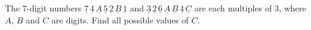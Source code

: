 The $7$-digit numbers $\underline{7}\,\underline{4}\,\underline{A}\,\underline{5}\,\underline{2}\,\underline{B}\,\underline{1}$ and $\underline{3}\,\underline{2}\,\underline{6}\,\underline{A}\,\underline{B}\,\underline{4}\,\underline{C}$ are each multiples of $3$, where $A$, $B$ and $C$ are digits. Find all possible values of $C$.
